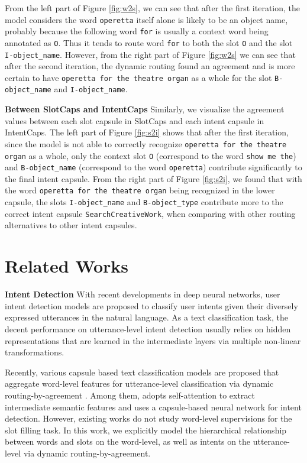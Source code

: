 \documentclass[11pt,a4paper,hyphens]{article}
\begin{document}
From the left part of Figure \ref{fig:w2s}, we can see that after the first iteration, the model considers the word \texttt{operetta} itself alone is likely to be an object name, probably because the following word \texttt{for} is usually a context word being annotated as \texttt{O}. Thus it tends to route word \texttt{for} to both the slot \texttt{O} and the slot \texttt{I-object\_name}. However, from the right part of Figure \ref{fig:w2s} we can see that after the second iteration, the dynamic routing found an agreement and is more certain to have \texttt{operetta for the theatre organ} as a whole for the slot \texttt{B-object\_name} and \texttt{I-object\_name}.

\textbf{Between SlotCaps and IntentCaps} Similarly, we visualize the agreement values between each slot capsule in SlotCaps and each intent capsule in IntentCaps.
The left part of Figure \ref{fig:s2i} shows that after the first iteration, since the model is not able to correctly recognize \texttt{operetta for the theatre organ} as a whole, only the context slot \texttt{O} (correspond to the word \texttt{show me the}) and \texttt{B-object\_name} (correspond to the word \texttt{operetta}) contribute significantly to the final intent capsule. From the right part of Figure \ref{fig:s2i}, we found that with the word  \texttt{operetta for the theatre organ} being recognized in the lower capsule, the slots \texttt{I-object\_name} and \texttt{B-object\_type} contribute more to the correct intent capsule \texttt{SearchCreativeWork}, when comparing with other routing alternatives to other intent capsules. \section{Related Works}
\noindent\textbf{Intent Detection}
With recent developments in deep neural networks, user intent detection models \citep{hu2009understanding,xu2013convolutional,zhang2016mining,liu2016attention,zhang2017bringing,chen2016end,xia2018zero} are proposed to classify user intents given their diversely expressed utterances in the natural language. As a text classification task, the decent performance on utterance-level intent detection usually relies on hidden representations that are learned in the intermediate layers via multiple non-linear transformations. 

Recently, various capsule based text classification models are proposed that aggregate word-level features for utterance-level classification via dynamic routing-by-agreement \citep{gong2018information,zhao2018investigating,xia2018zero}. Among them, \citet{xia2018zero} adopts self-attention to extract intermediate semantic features and uses a capsule-based neural network for intent detection. 
However, existing works do not study word-level supervisions for the slot filling task. In this work, we explicitly model the hierarchical relationship between words and slots on the word-level, as well as intents on the utterance-level via dynamic routing-by-agreement.
\end{document}
